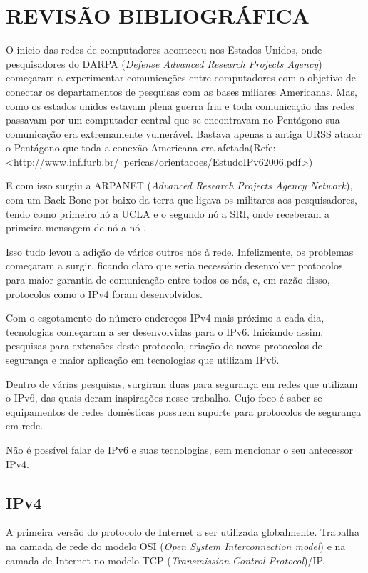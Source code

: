 \chapter{REVISÃO BIBLIOGRÁFICA}\label{ch:rev-bibs}

O inicio das redes de computadores aconteceu nos Estados Unidos, onde pesquisadores do DARPA (\textit{Defense Advanced Research Projects Agency}) começaram a experimentar comunicações entre computadores com o objetivo de conectar os departamentos de pesquisas com as bases miliares Americanas. Mas, como os estados unidos estavam plena guerra fria e toda comunicação das redes passavam por um computador central que se encontravam no Pentágono sua comunicação era extremamente vulnerável. Bastava apenas a antiga URSS atacar o Pentágono que toda a conexão Americana era afetada(Refe: <http://www.inf.furb.br/~pericas/orientacoes/EstudoIPv62006.pdf>)

E com isso surgiu a ARPANET (\textit{Advanced Research Projects Agency Network}), com um Back Bone por baixo da terra que ligava os militares aos pesquisadores, tendo como primeiro nó a UCLA e o segundo nó a SRI, onde receberam a primeira mensagem de nó-a-nó \cite{comeco-internet}.

Isso tudo levou a adição de vários outros nós à rede. Infelizmente, os problemas começaram a surgir, ficando claro que seria necessário desenvolver protocolos para maior garantia de comunicação entre todos os nós, e, em razão disso, protocolos como o IPv4 foram desenvolvidos.

Com o esgotamento do número endereços IPv4 mais próximo a cada dia, tecnologias começaram a ser desenvolvidas para o IPv6. Iniciando assim, pesquisas para extensões deste protocolo, criação de novos protocolos de segurança e maior aplicação em tecnologias que utilizam IPv6.

Dentro de várias pesquisas, surgiram duas para segurança em redes que utilizam o IPv6, das quais deram inspirações nesse trabalho. Cujo foco é saber se equipamentos de redes domésticas possuem suporte para protocolos de segurança em rede.

Não é possível falar de IPv6 e suas tecnologias, sem mencionar o seu antecessor IPv4.

\section{IPv4}\label{sec:protIPv4}

A primeira versão do protocolo de Internet a ser utilizada globalmente. Trabalha na camada de rede do modelo OSI (\textit{Open System Interconnection model}) e na camada de Internet no modelo TCP (\textit{Transmission Control Protocol})/IP.

